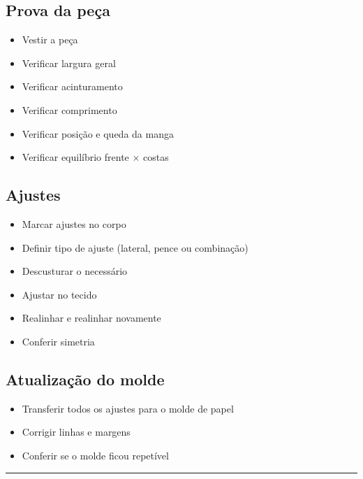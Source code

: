 \documentclass[
  brazilian,
  8pt,
  oneside]{book}
\providecommand{\tightlist}{%
  \setlength{\itemsep}{0pt}\setlength{\parskip}{0pt}}
\begin{document}
\subsection{Prova da peça}\label{prova-da-peuxe7a}

\begin{itemize}
\tightlist
\item[$\square$]
  Vestir a peça
\item[$\square$]
  Verificar largura geral
\item[$\square$]
  Verificar acinturamento
\item[$\square$]
  Verificar comprimento
\item[$\square$]
  Verificar posição e queda da manga
\item[$\square$]
  Verificar equilíbrio frente × costas
\end{itemize}

\subsection{Ajustes}\label{ajustes}

\begin{itemize}
\tightlist
\item[$\square$]
  Marcar ajustes no corpo
\item[$\square$]
  Definir tipo de ajuste (lateral, pence ou combinação)
\item[$\square$]
  Descusturar o necessário
\item[$\square$]
  Ajustar no tecido
\item[$\square$]
  Realinhar e realinhar novamente
\item[$\square$]
  Conferir simetria
\end{itemize}

\subsection{Atualização do molde}\label{atualizauxe7uxe3o-do-molde}

\begin{itemize}
\tightlist
\item[$\square$]
  Transferir todos os ajustes para o molde de papel
\item[$\square$]
  Corrigir linhas e margens
\item[$\square$]
  Conferir se o molde ficou repetível
\end{itemize}

\begin{center}\rule{0.5\linewidth}{0.5pt}\end{center}
\end{document}
